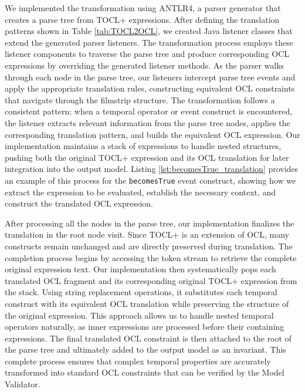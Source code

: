 We implemented the transformation using ANTLR4, a parser generator that creates a 
parse tree from TOCL+ expressions. After defining the translation patterns shown 
in Table \ref{tab:TOCL2OCL}, we created Java listener classes that extend the 
generated parser listeners. The transformation process employs these listener 
components to traverse the parse tree and produce corresponding OCL expressions 
by overriding the generated listener methods. As the parser walks through each node 
in the parse tree, our listeners intercept parse tree events and apply the appropriate 
translation rules, constructing equivalent OCL constraints that navigate through 
the filmstrip structure. The transformation follows a consistent pattern: when a 
temporal operator or event construct is encountered, the listener extracts relevant 
information from the parse tree nodes, applies the corresponding translation pattern, 
and builds the equivalent OCL expression. Our implementation maintains a stack of 
expressions to handle nested structures, pushing both the original TOCL+ expression 
and its OCL translation for later integration into the output model.
Listing \ref{lst:becomesTrue_translation} provides an example of this process for 
the \texttt{becomesTrue} event construct, showing how we extract the expression 
to be evaluated, establish the necessary context, and construct the translated OCL 
expression. 

After processing all the nodes in the parse tree, our implementation finalizes the 
translation in the root node visit. Since TOCL+ is an extension of OCL, many 
constructs remain unchanged and are directly preserved during translation. The 
completion process begins by accessing the token stream to retrieve the complete 
original expression text. Our implementation then systematically pops each translated 
OCL fragment and its corresponding original TOCL+ expression from the stack. Using 
string replacement operations, it substitutes each temporal construct with its 
equivalent OCL translation while preserving the structure of the original expression. 
This approach allows us to handle nested temporal operators naturally, as inner 
expressions are processed before their containing expressions. The final translated 
OCL constraint is then attached to the root of the parse tree and ultimately added 
to the output model as an invariant. This complete process ensures that complex 
temporal properties are accurately transformed into standard OCL constraints that 
can be verified by the Model Validator.

